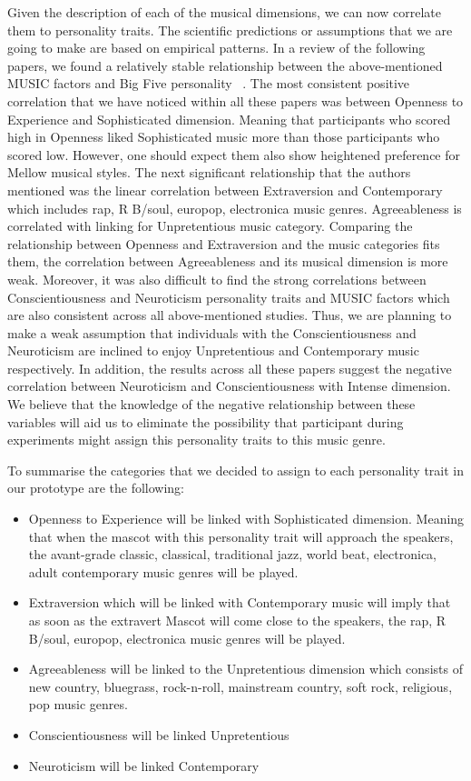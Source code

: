 Given the description of each of the musical dimensions, we can now correlate them to personality traits.
The scientific predictions or assumptions that we are going to make are based on empirical patterns.
In a review of the following papers, we found a relatively stable relationship between the
above-mentioned MUSIC factors and Big Five
personality ~\cite{schafer2017can,bonneville2013music,fricke2017personality,greenberg2016song,langmeyer2012music}.
The most consistent positive correlation that we have noticed within all these papers was
between Openness to Experience and Sophisticated dimension.
Meaning that participants who scored high in Openness liked
Sophisticated music more than those participants who scored low.
However, one should expect them also show heightened preference for Mellow musical styles.
The next significant relationship that the authors mentioned was the linear correlation between
Extraversion and Contemporary which includes rap, R B/soul, europop, electronica music genres.
Agreeableness is correlated with linking for Unpretentious music category.
Comparing the relationship between Openness and Extraversion and the music categories fits them,
the correlation between Agreeableness and its musical dimension is more weak.
Moreover, it was also difficult to find the strong correlations between
Conscientiousness and Neuroticism personality traits and MUSIC factors which are
also consistent across all above-mentioned studies.
Thus, we are planning to make a weak assumption that individuals with the
Conscientiousness and Neuroticism are inclined to enjoy Unpretentious and Contemporary music respectively.
In addition, the results across all these papers suggest the negative correlation between
Neuroticism and Conscientiousness with Intense dimension.
We believe that the knowledge of the negative relationship between these variables will aid us to eliminate
the possibility that participant during experiments might assign this personality traits to this music genre.

To summarise the categories that we decided to assign to each personality trait in our prototype are the following:
\begin{itemize}
\item Openness to Experience will be linked with Sophisticated dimension.
      Meaning that when the mascot with this personality trait will approach the speakers,
      the avant-grade classic, classical, traditional jazz, world beat, electronica, adult
      contemporary music genres will be played.
\item Extraversion which will be linked with Contemporary music will imply that as soon as the extravert
      Mascot will come close to the speakers, the rap, R B/soul, europop, electronica music genres will be played.
\item Agreeableness will be linked to the Unpretentious dimension which consists of new country,
      bluegrass, rock-n-roll, mainstream country, soft rock, religious, pop music genres.
\item Conscientiousness will be linked Unpretentious
\item Neuroticism will be linked Contemporary
\end{itemize}

